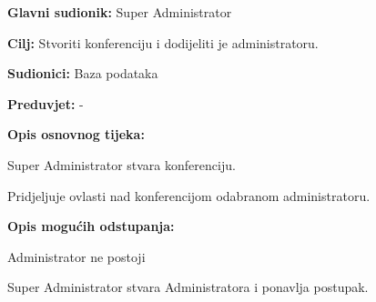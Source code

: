 					\noindent {}
					\begin{packed_item}
	
						\item \textbf{Glavni sudionik: }Super Administrator
						\item  \textbf{Cilj:} Stvoriti konferenciju i dodijeliti je administratoru.
						\item  \textbf{Sudionici:} Baza podataka
						\item  \textbf{Preduvjet:} -
						\item  \textbf{Opis osnovnog tijeka:}
						
						\item[] \begin{packed_enum}
	
							\item Super Administrator stvara konferenciju.
							\item Pridjeljuje ovlasti nad konferencijom odabranom administratoru.
						\end{packed_enum}
						
						\item  \textbf{Opis mogućih odstupanja:}
						
						\item[] \begin{packed_item}
	
							\item[2.a] Administrator ne postoji
							\item[] \begin{packed_enum}
								
								\item Super Administrator stvara Administratora i ponavlja postupak.
								
							\end{packed_enum}
							
						\end{packed_item}
					\end{packed_item}

